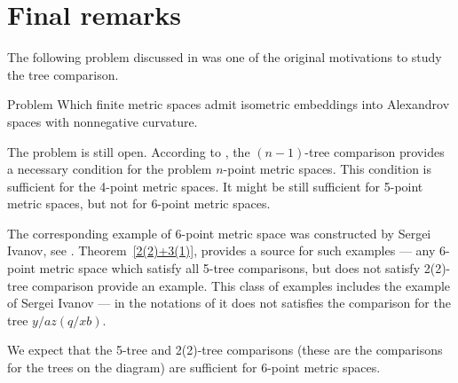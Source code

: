 \section{Final remarks}

The following problem discussed in \cite[7.1]{AKP} was one of the original motivations to study the tree comparison.

\begin{thm}{Problem}
Which finite metric spaces admit isometric embeddings into Alexandrov spaces with nonnegative curvature.
\end{thm}

The problem is still open.
According to \cite[4.1]{AKP}, the $(n-1)$-tree comparison provides a necessary condition for the problem $n$-point metric spaces.
This condition is sufficient for the 4-point metric spaces.
It might be still sufficient for 5-point metric spaces,
but not for 6-point metric spaces.

The corresponding example of 6-point metric space was constructed by Sergei Ivanov, see \cite{AKP}.
Theorem~\ref{2(2)+3(1)}, provides a source for such examples --- any 6-point metric space which satisfy all 5-tree comparisons, but does not satisfy 2(2)-tree comparison provide an example.
This class of examples includes the example of Sergei Ivanov --- in the notations of \cite[7.1]{AKP} it does not satisfies the comparison for the tree $y/az(q/xb)$.

We expect that the 5-tree and 2(2)-tree comparisons (these are the comparisons for the trees on the diagram) are sufficient for 6-point metric spaces. 
\hide
\begin{center}
\hskip10mm

\end{center}
\unhide

